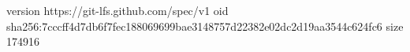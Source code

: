 version https://git-lfs.github.com/spec/v1
oid sha256:7cccff4d7db6f7fec188069699bae3148757d22382e02dc2d19aa3544c624fc6
size 174916
